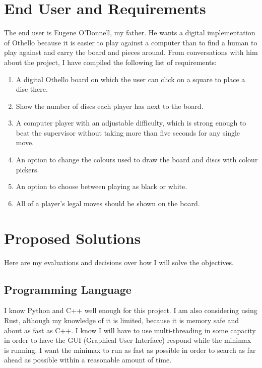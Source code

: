 \documentclass[12pt, a4paper]{report}
\begin{document}
\section{End User and Requirements}
The end user is Eugene O'Donnell, my father.
He wants a digital implementation of Othello because it is easier to play against a computer than to find a human to play against and carry the board and pieces around.
From conversations with him about the project, I have compiled the following list of requirements:
\begin{enumerate}
\item A digital Othello board on which the user can click on a square to place a disc there.
\item Show the number of discs each player has next to the board.
\item A computer player with an adjustable difficulty, which is strong enough to beat the supervisor without taking more than five seconds for any single move.
\item An option to change the colours used to draw the board and discs with colour pickers.
\item An option to choose between playing as black or white.
\item All of a player's legal moves should be shown on the board.
\end{enumerate}

\section{Proposed Solutions}
Here are my evaluations and decisions over how I will solve the objectives.
\subsection{Programming Language}
I know Python and C++ well enough for this project.
I am also considering using Rust, although my knowledge of it is limited, because it is memory safe and about as fast as C++.
I know I will have to use multi-threading in some capacity in order to have the GUI (Graphical User Interface) respond while the minimax is running.
I want the minimax to run as fast as possible in order to search as far ahead as possible within a reasonable amount of time.
\end{document}
